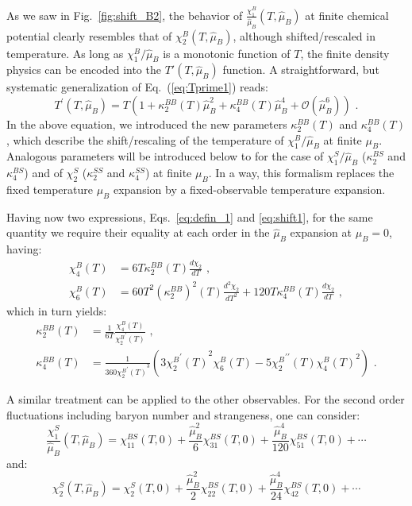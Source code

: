 \documentclass[aps,prd,twocolumn,superscriptaddress]{revtex4-2}
\newcommand{\beq}{\begin{equation}}
\newcommand{\eeq}{\end{equation}}
\newcommand \hmu {\hat{\mu}}
\begin{document}
As we saw in Fig.~\ref{fig:shift_B2}, the behavior 
of $\frac{\chi_1^B}{\hmu_B} (T,\hmu_B)$ at finite 
chemical potential clearly resembles that of 
$\chi_2^B (T, \hmu_B)$, although shifted/rescaled in 
temperature. As long as $\chi^B_1/\hmu_B$ is a monotonic function 
of $T$, the finite density physics can be encoded into the $T'(T,\hmu_B)$
function. A straightforward, but systematic generalization of 
Eq.~(\ref{eq:Tprime1}) reads:
\begin{equation} \label{eq:Tprime}
T^\prime (T,\hmu_B) = T \left( 1 + \kappa_2^{BB} (T) \hmu_B^2
+ \kappa_4^{BB} (T) \hmu_B^4 +\mathcal{O}(\hmu_B^6)\right) \, \, .
\end{equation}
In the above equation, we introduced the new parameters $\kappa_2^{BB}(T)$ and 
$\kappa_4^{BB}(T)$, which describe the shift/rescaling of the temperature of 
$\chi_1^B/\hmu_B$ at finite $\mu_B$. Analogous parameters will be introduced below 
to for the case of $\chi_1^S/\hmu_B$ ($\kappa_2^{BS}$ and $\kappa_4^{BS}$) and of 
$\chi_2^S$ ($\kappa_2^{SS}$ and $\kappa_4^{SS}$) at finite $\mu_B$.
In a way, this formalism replaces the fixed temperature $\mu_B$ expansion 
by a fixed-observable temperature expansion.

Having now two expressions, Eqs.~\eqref{eq:defin_1} and \eqref{eq:shift1},
for the same quantity we require their equality at each order in the
$\hmu_B$ expansion at $\mu_B=0$, having:
\begin{align} \label{eq:chisVkappas}
\chi_4^B (T) &= 6 T \kappa_2^{BB} (T) \frac{d\chi_2}{dT}  \, \, ,\\ \nonumber
\chi_6^B (T) &=  60 T^2 (\kappa_2^{BB})^2 (T) \frac{d^2\chi_2}{dT^2} + 120 T \kappa_4^{BB} (T) \frac{d\chi_2}{dT}  \, \, ,
\end{align} 
which in turn yields:
\begin{align} \label{eq:kappasVchis}
\kappa_2^{BB} (T) &= \frac{1}{6T} \frac{\chi_4^B(T)}{{\chi_2^B}^\prime(T)} \, \, , \\ \nonumber
\kappa_4^{BB} (T) &= \frac{1}{360 {{\chi_2^B}^\prime(T)}^3} \left( 3 {{\chi_2^B}^\prime(T)}^2 \chi_6^B(T) - 5 {\chi_2^B}^{\prime \prime}(T) {\chi_4^B(T)}^2 \right) \, \, .
\end{align}

A similar treatment can be applied to the other observables. 
For the second order fluctuations including baryon number and 
strangeness, one can consider:
\beq  \label{eq:defin_BS}
\frac{\chi_1^S}{\hmu_B} (T,\hmu_B) = \chi_{11}^{BS} 
(T, 0) + \frac{\hmu_B^2}{6} \chi_{31}^{BS}(T, 0) + \frac{\hmu_B^4}{120} \chi_{51}^{BS} (T,0) + \cdots
\eeq 
and:
\beq  \label{eq:defin_SS}
\chi_2^S (T,\hmu_B) = \chi_2^S (T, 0) + \frac{\hmu_B^2}{2} 
\chi_{22}^{BS}(T, 0) + \frac{\hmu_B^4}{24} 
\chi_{42}^{BS} (T,0) + \cdots
\eeq
\end{document}
